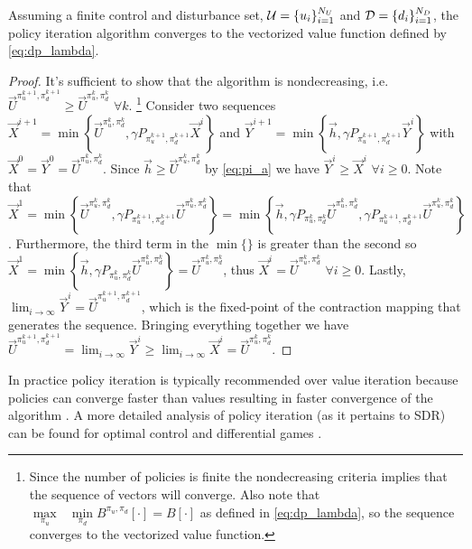 \begin{proposition}
Assuming a finite control and disturbance set, $\mathcal{U}=\{u_i\}_{i=1}^{N_U}$ and $\mathcal{D}=\{d_i\}_{i=1}^{N_D}$, the policy iteration algorithm converges to the vectorized value function defined by \eqref{eq:dp_lambda}.
\end{proposition}

\noindent \begin{proof}
It's sufficient to show that the algorithm is nondecreasing, i.e. $\vec{U}^{\pi_u^{k+1}, \pi_d^{k+1}} \geq \vec{U}^{\pi_u^k, \pi_d^k}$ $\forall k$. \footnote{Since the number of policies is finite the nondecreasing criteria implies that the sequence of vectors will converge. Also note that $\underset{\pi_u}{\max}\text{ }\underset{ \pi_d}{\min}B^{\pi_u, \pi_d}[\cdot] = B[\cdot]$ as defined in \eqref{eq:dp_lambda}, so the sequence converges to the vectorized value function.} Consider two sequences $\vec{X}^{i+1}=\min\left\{\vec{U}^{\pi_u^k, \pi_d^k}, \gamma P_{\pi_u^{k+1}, \pi_d^{k+1}}\vec{X}^i \right\}$ and $\vec{Y}^{i+1}=\min\left\{\vec{h}, \gamma P_{\pi_u^{k+1}, \pi_d^{k+1}}\vec{Y}^i \right\}$ with $\vec{X}^0=\vec{Y}^0=\vec{U}^{\pi_u^k, \pi_d^k}$. Since $\vec{h}\geq \vec{U}^{\pi_u^k, \pi_d^k}$ by \eqref{eq:pi_a} we have $\vec{Y}^i \geq \vec{X}^i$ $\forall i \geq 0$. Note that $\vec{X}^{1}=\min\left\{\vec{U}^{\pi_u^k, \pi_d^k},\gamma P_{\pi_u^{k+1}, \pi_d^{k+1}}\vec{U}^{\pi_u^k, \pi_d^k}\right\}=\min\left\{\vec{h}, \gamma P_{\pi_u^{k}, \pi_d^{k}}\vec{U}^{\pi_u^k, \pi_d^k},\gamma P_{\pi_u^{k+1}, \pi_d^{k+1}}\vec{U}^{\pi_u^k, \pi_d^k}\right\}$. Furthermore, the third term in the $\min\{\}$ is greater than the second so $\vec{X}^{1}=\min\left\{\vec{h}, \gamma P_{\pi_u^{k}, \pi_d^{k}}\vec{U}^{\pi_u^k, \pi_d^k} \right\} =  \vec{U}^{\pi_u^k, \pi_d^k}$, thus $\vec{X}^{i} =  \vec{U}^{\pi_u^k, \pi_d^k}$ $\forall i \geq 0$. Lastly, $\lim_{i\rightarrow \infty}\vec{Y}^i= \vec{U}^{\pi_u^{k+1}, \pi_d^{k+1}}$, which is the fixed-point of the contraction mapping that generates the sequence. Bringing everything together we have $\vec{U}^{\pi_u^{k+1}, \pi_d^{k+1}} = \lim_{i\rightarrow \infty}\vec{Y}^i \geq   \lim_{i\rightarrow \infty}\vec{X}^i = \vec{U}^{\pi_u^{k}, \pi_d^{k}}.$
\end{proof}

In practice policy iteration is typically recommended over value iteration because policies can converge faster than values resulting in faster convergence of the algorithm \cite{Russell2003}. A more detailed analysis of policy iteration (as it pertains to SDR) can be found for optimal control \cite{Howard1964, Kalaba1959, Puterman1979} and differential games \cite{Bokanowski2009}. 


